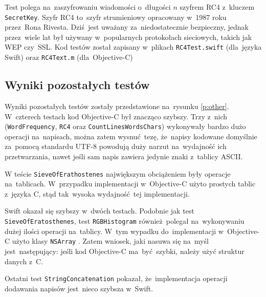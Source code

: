 \documentclass[mgr, shortabstract]{iithesis}
\newcommand{\objcinline}[1]{
    \texttt{#1}
}
\begin{document}
Test polega na~zaszyfrowaniu wiadomości o~długości $n$ szyfrem RC4 z~kluczem \texttt{SecretKey}. Szyfr RC4 to~szyfr strumieniowy opracowany w~1987 roku przez~Rona Rivesta. Dziś jest uważany za~niedostatecznie bezpieczny, jednak przez~wiele lat był używany w~popularnych protokołach sieciowych, takich jak WEP czy~SSL. Kod testów został zapisany w~plikach \texttt{RC4Test.swift} (dla~języka Swift) oraz \texttt{RC4Text.m} (dla~Objective-C)

\subsection{Wyniki pozostałych testów}

Wyniki pozostałych testów zostały przedstawione na~rysunku \ref{p:other}. W~czterech testach kod Objective-C był znacząco szybszy. Trzy z~nich (\texttt{WordFrequency}, \texttt{RC4} oraz \texttt{CountLinesWordsChars}) wykonywały bardzo dużo operacji na~napisach, można zatem wysnuć tezę, że~napisy kodowane domyślnie za~pomocą standardu UTF-8 powodują duży narzut na~wydajność ich przetwarzania, nawet jeśli sam napis zawiera jedynie znaki z~tablicy ASCII.

W teście \texttt{SieveOfErathostenes} największym obciążeniem były operacje na~tablicach. W~przypadku implementacji w~Objective-C użyto prostych tablic z~języka C, stąd tak~wysoka wydajność tej implementacji.

Swift okazał się szybszy w~dwóch testach. Podobnie jak test \texttt{SieveOfEratosthenes}, test \texttt{RGBHistogram} również polegał na~wykonywaniu dużej ilości operacji na~tablicy. W~tym wypadku do~implementacji w~Objective-C użyto klasy \objcinline{NSArray}. Zatem wniosek, jaki nasuwa się na~myśl jest~następujący: jeśli kod Objective-C ma~być szybki, należy użyć struktur danych z~C.

Ostatni test \texttt{StringConcatenation} pokazał, że~implementacja operacji dodawania napisów jest~nieco szybsza w~Swift.
\end{document}

